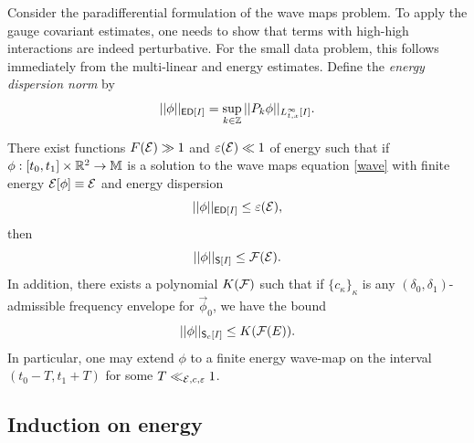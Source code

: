
Consider the paradifferential formulation of the wave maps problem. To apply the gauge covariant estimates, one needs to show that terms with high-high interactions are indeed perturbative. For the small data problem, this follows immediately from the multi-linear and energy estimates. Define the \emph{energy dispersion norm} by
	\[ ||\phi||_{\mathsf{ED}[I]}= \sup_{k \in \mathbb Z} ||P_k \phi||_{L^\infty_{t, x} [I]}. \]

\begin{theorem}
	There exist functions $F(\mathcal E) \gg 1$ and $\varepsilon (\mathcal E) \ll 1$ of energy such that if $\phi : [t_0, t_1] \times \mathbb R^2 \to \mathbb M$ is a solution to the wave maps equation \eqref{wave} with finite energy $\mathcal E[\phi] \equiv \mathcal E$ and energy dispersion
		\begin{equation}
			||\phi||_{\mathsf{ED} [I]} \leq \varepsilon (\mathcal E), 
		\label{eq:ED}
		\end{equation}
	then 
		\begin{equation}
			||\phi||_{\mathsf S [I]} \leq \mathcal F(\mathcal E).
		\label{eq:S}
		\end{equation}
	In addition, there exists a polynomial $K(\mathcal F)$ such that if $\{c_\kappa\}_\kappa$ is any $(\delta_0, \delta_1)$-admissible frequency envelope for $\vec \phi_0$, we have the bound 
		\[ ||\phi||_{\mathsf S_c [I]} \leq K(\mathcal F(E)).  \]
	In particular, one may extend $\phi$ to a finite energy wave-map on the interval $(t_0 - T, t_1 + T)$ for some $T \ll_{\mathcal E, c, \varepsilon} 1$. \label{thm:ED}
\end{theorem}

\subsection{Induction on energy}

